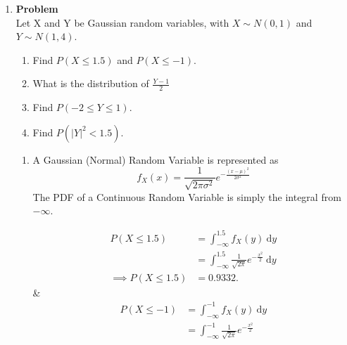 \documentclass[12pt]{article}
\newenvironment{Ex}{\textbf{Problem}\vspace{.75em}\\}{}
\newcommand{\dd}[1]{\:\mathrm{d}{#1}}
\begin{document}
\begin{enumerate}
\begin{Ex}
\begin{solution}
\begin{enumerate}
\begin{equation}
\begin{aligned}
            &= \int_{-2}^{z} \left(\frac{2+2y}{3}\right) \dd{y} \\
          \end{aligned}
        \end{equation}
      \end{enumerate}
    \end{solution}
  \end{Ex}
\item
  \begin{Ex}
    Let X and Y be Gaussian random variables, with $X \sim N(0,1)$ and
    $Y \sim N(1,4)$.
    \begin{enumerate}
    \item Find $P(X \le 1.5)$ and $P(X \le -1)$.
    \item What is the distribution of $\frac{Y-1}{2}$
    \item Find $P(-2 \le Y \le 1)$.
    \item Find $P(|Y|^2 < 1.5)$.
    \end{enumerate}
    \begin{solution} \hfill
      \begin{enumerate}
      \item A Gaussian (Normal) Random Variable is represented as
        \begin{equation}
          \label{eq:2-gaussian}
          f_X(x) = \frac{1}{\sqrt{2\pi\sigma^2}}e^{-\frac{(x-\mu)^2}{2\sigma^2}}
        \end{equation}
        The PDF of a Continuous Random Variable is simply the integral
        from $-\infty$.
        \begin{multicols}{2}
          \begin{equation}
            \label{eq:2ai-sol}
            \begin{aligned}
              P(X\le 1.5) &= \int_{-\infty}^{1.5} f_X(y) \dd{y} \\
              &= \int_{-\infty}^{1.5} \frac{1}{\sqrt{2\pi}}e^{-\frac{x^2}{2}}
              \dd{y} \\
              \implies P(X \le 1.5 )&= 0.9332.
            \end{aligned}
          \end{equation} &
          \begin{equation}
            \label{eq:2aii-sol}
            \begin{aligned}
              P(X\le -1) &= \int_{-\infty}^{-1} f_X(y) \dd{y} \\
              &= \int_{-\infty}^{-1} \frac{1}{\sqrt{2\pi}}e^{-\frac{x^2}{2}}

\end{aligned}
\end{equation}
\end{multicols}
\end{enumerate}
\end{solution}
\end{Ex}
\end{enumerate}
\end{document}

